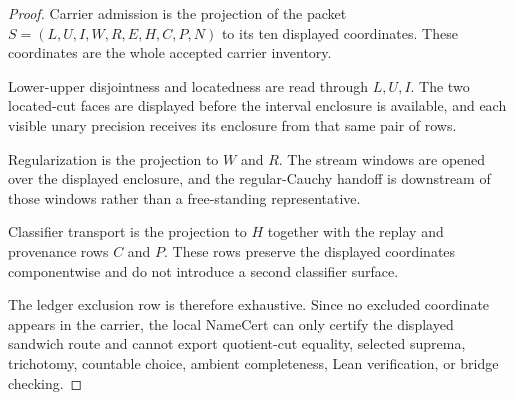 \begin{proof}
Carrier admission is the projection of the packet $S=(L,U,I,W,R,E,H,C,P,N)$ to its ten displayed coordinates. These coordinates are the whole accepted carrier inventory.

Lower-upper disjointness and locatedness are read through $L,U,I$. The two located-cut faces are displayed before the interval enclosure is available, and each visible unary precision receives its enclosure from that same pair of rows.

Regularization is the projection to $W$ and $R$. The stream windows are opened over the displayed enclosure, and the regular-Cauchy handoff is downstream of those windows rather than a free-standing representative.

Classifier transport is the projection to $H$ together with the replay and provenance rows $C$ and $P$. These rows preserve the displayed coordinates componentwise and do not introduce a second classifier surface.

The ledger exclusion row is therefore exhaustive. Since no excluded coordinate appears in the carrier, the local NameCert can only certify the displayed sandwich route and cannot export quotient-cut equality, selected suprema, trichotomy, countable choice, ambient completeness, Lean verification, or bridge checking.
\end{proof}


\begin{closurestatus}{\DedekindCauchySandwichUp}
  \theoryclosure{\seedClosure}
  \formalstatus{\unformalizedV}
\end{closurestatus}
